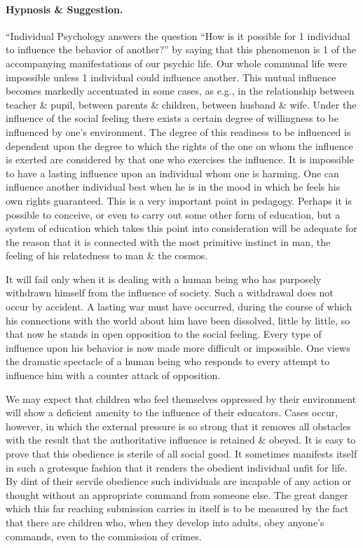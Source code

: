\documentclass{article}
\begin{document}
\paragraph{Hypnosis \& Suggestion.} ``Individual Psychology answers the question ``How is it possible for 1 individual to influence the behavior of another?'' by saying that this phenomenon is 1 of the accompanying manifestations of our psychic life. Our whole communal life were impossible unless 1 individual could influence another. This mutual influence becomes markedly accentuated in some cases, as e.g., in the relationship between teacher \& pupil, between parents \& children, between husband \& wife. Under the influence of the social feeling there exists a certain degree of willingness to be influenced by one's environment. The degree of this readiness to be influenced is dependent upon the degree to which the rights of the one on whom the influence is exerted are considered by that one who exercises the influence. It is impossible to have a lasting influence upon an individual whom one is harming. One can influence another individual best when he is in the mood in which he feels his own rights guaranteed. This is a very important point in pedagogy. Perhaps it is possible to conceive, or even to carry out some other form of education, but a system of education which takes this point into consideration will be adequate for the reason that it is connected with the most primitive instinct in man, the feeling of his relatedness to man \& the cosmos.

It will fail only when it is dealing with a human being who has purposely withdrawn himself from the influence of society. Such a withdrawal does not occur by accident. A lasting war must have occurred, during the course of which his connections with the world about him have been dissolved, little by little, so that now he stands in open opposition to the social feeling. Every type of influence upon his behavior is now made more difficult or impossible. One views the dramatic spectacle of a human being who responds to every attempt to influence him with a counter attack of opposition.

We may expect that children who feel themselves oppressed by their environment will show a deficient amenity to the influence of their educators. Cases occur, however, in which the external pressure is so strong that it removes all obstacles with the result that the authoritative influence is retained \& obeyed. It is easy to prove that this obedience is sterile of all social good. It sometimes manifests itself in such a grotesque fashion that it renders the obedient individual unfit for life. By dint of their servile obedience such individuals are incapable of any action or thought without an appropriate command from someone else. The great danger which this far reaching submission carries in itself is to be measured by the fact that there are children who, when they develop into adults, obey anyone's commands, even to the commission of crimes.
\end{document}

